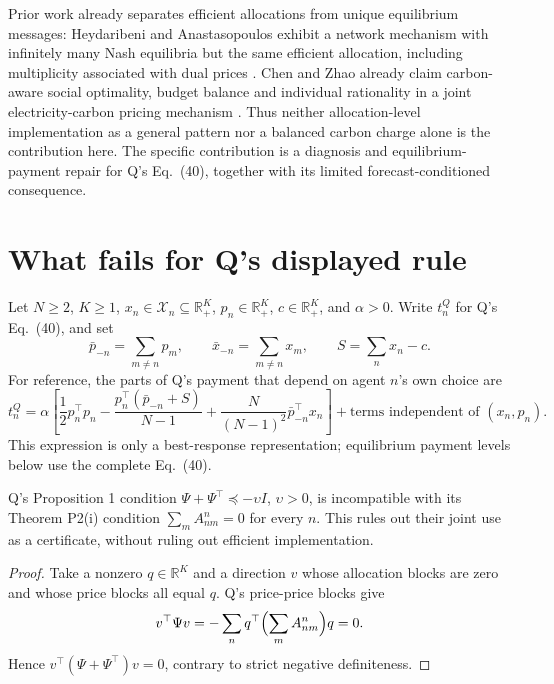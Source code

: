 \documentclass{article}
\begin{document}
Prior work already separates efficient allocations from unique equilibrium messages: Heydaribeni and Anastasopoulos exhibit a network mechanism with infinitely many Nash equilibria but the same efficient allocation, including multiplicity associated with dual prices \cite{heydaribeni2019distributed}. Chen and Zhao already claim carbon-aware social optimality, budget balance and individual rationality in a joint electricity-carbon pricing mechanism \cite{chen2024achieving}. Thus neither allocation-level implementation as a general pattern nor a balanced carbon charge alone is the contribution here. The specific contribution is a diagnosis and equilibrium-payment repair for Q's Eq.~(40), together with its limited forecast-conditioned consequence. %

\section{What fails for Q's displayed rule}

Let \(N\geq2\), \(K\geq1\), \(x_n\in\mathcal X_n\subseteq\mathbb R_+^K\),
\(p_n\in\mathbb R_+^K\), \(c\in\mathbb R_+^K\), and \(\alpha>0\).
Write \(t_n^Q\) for Q's Eq.~(40), and set
\[
\bar p_{-n}=\sum_{m\ne n}p_m,\qquad
\bar x_{-n}=\sum_{m\ne n}x_m,\qquad
S=\sum_n x_n-c.
\]
For reference, the parts of Q's payment that depend on agent \(n\)'s own choice are
\[
t_n^Q=\alpha\left[\frac12p_n^\top p_n
-\frac{p_n^\top(\bar p_{-n}+S)}{N-1}
+\frac{N}{(N-1)^2}\bar p_{-n}^\top x_n\right]
+\text{terms independent of }(x_n,p_n).
\]
This expression is only a best-response representation; equilibrium payment levels below use the complete Eq.~(40). %

\begin{proposition}
Q's Proposition 1 condition \(\Psi+\Psi^\top\preceq-\upsilon I\), \(\upsilon>0\), is incompatible with its Theorem P2(i) condition \(\sum_m A_{nm}^n=0\) for every \(n\). This rules out their joint use as a certificate, without ruling out efficient implementation. %
\end{proposition}
\begin{proof}
Take a nonzero \(q\in\mathbb R^K\) and a direction \(v\) whose allocation blocks are zero and whose price blocks all equal \(q\). Q's price-price blocks give
\[
v^\top\Psi v=-\sum_n q^\top\Bigl(\sum_m A_{nm}^n\Bigr)q=0.
\]
Hence \(v^\top(\Psi+\Psi^\top)v=0\), contrary to strict negative definiteness. %
\end{proof}
\end{document}
